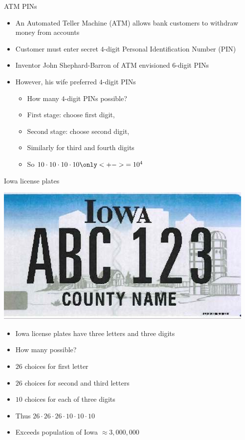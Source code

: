\documentclass[handout]{beamer}
\theoremstyle{definition}
\begin{document}
\begin{frame}{ATM PINs}
\begin{itemize}
\item An Automated Teller Machine (ATM)
allows bank customers to withdraw money from accounts
\item Customer must enter secret $4$-digit
Personal Identification Number (PIN)
\item Inventor John Shephard-Barron of ATM envisioned $6$-digit PINs
\item However, his wife preferred $4$-digit PINs
\begin{example}
\begin{itemize}
\item How many $4$-digit PINs possible?
\item First stage: choose first digit, 
\item Second stage: choose second digit, 
\item Similarly for third and fourth digits
\item So $10\cdot 10\cdot 10\cdot 10\only<+->{=10^4}$
\end{itemize}
\end{example}
\end{itemize}
\end{frame}

\begin{frame}{Iowa license plates}
\begin{multicols}{2}
\includegraphics[scale=.3]{LicencePlate}
\begin{itemize}
\item Iowa license plates have three letters
and three digits
\item How many possible?
\item $26$ choices for first letter
\columnbreak
\item $26$ choices for second and third letters
\item $10$ choices for each of three digits
\item Thus $26\cdot 26\cdot 26\cdot 10\cdot 10\cdot 10$
\item Exceeds population of Iowa $\approx 3,000,000$
\end{itemize}
\end{multicols}
\end{frame}
\end{document}
